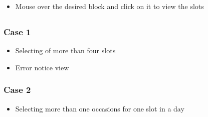 \documentclass[letterpaper,10pt,english]{sphinxmanual}
\begin{document}
\begin{itemize}
\item {} 
Mouse over the desired block and click on it to view the slots

\end{itemize}



\subsection{}
\label{\detokenize{user_manual:anamolies-management}}

\subsubsection{Case 1}
\label{\detokenize{user_manual:case-1}}\begin{itemize}
\item {} 
Selecting of more than four slots

\end{itemize}

\begin{itemize}
\item {} 
Error notice view

\end{itemize}



\subsubsection{Case 2}
\label{\detokenize{user_manual:case-2}}\begin{itemize}
\item {} 
Selecting more than one occasions for one slot in a day

\end{itemize}
\end{document}

